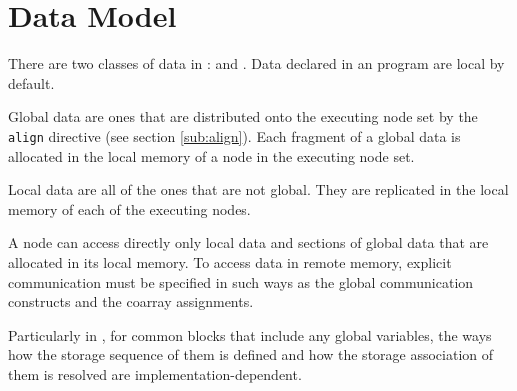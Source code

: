 \section{Data Model}


There are two classes of data in {\XMP}: {\it {}} and
{\it {}}. Data declared in an {\XMP} program are local by
default.

Global data are ones that are distributed onto the executing node set by
the {\tt align} directive (see section \ref{sub:align}). Each fragment
of a global data is allocated in the local memory of a node in the
executing node set.
%
%

Local data are all of the ones that are not global. They are replicated
in the local memory of each of the executing nodes.


A node can access directly only local data and sections of global data
that are allocated in its local memory.
%
To access data in remote memory, explicit communication must be
specified in such ways as the global communication constructs and
the coarray assignments.


Particularly in {\XMPF}, for common blocks that include any global
variables, the ways how the storage sequence of them is defined and how
the storage association of them is resolved are
implementation-dependent.

